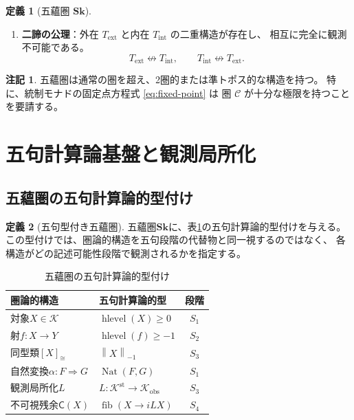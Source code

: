\documentclass[11pt,a4paper]{ltjsarticle}
\theoremstyle{definition}
\newtheorem{definition}{定義}[section]
\newtheorem{remark}{注記}[section]
\newcommand{\Sk}{\mathbf{Sk}}
\newcommand{\T}{\mathcal{T}}
\newcommand{\fold}{\mu}
\newcommand{\unfold}{\delta}
\newcommand{\ext}{\mathrm{ext}}
\newcommand{\intn}{\mathrm{int}}
\newcommand{\TExt}{T_{\ext}}
\newcommand{\TInt}{T_{\intn}}
\newcommand{\trunc}[1]{\left\lVert #1\right\rVert_{-1}}
\newcommand{\Kstab}{\mathcal{K}^{\mathrm{st}}}
\newcommand{\Kobs}{\mathcal{K}_{\mathrm{obs}}}
\newcommand{\Residual}{\mathsf{C}}
\begin{document}
\begin{definition}[五蘊圏 $\Sk$]
\begin{enumerate}[label=(\arabic*)]
  後退（展開）$\unfold^\T : \T \to F(\T)$ の間に
  \begin{equation}
  (\fold^\T \circ \T\unfold^\T) \cong (\unfold^\T \circ \fold^\T)
  \label{eq:frobenius}
  \end{equation}
  が成立する。
\item \textbf{二諦の公理}：外在 $\TExt$ と内在 $\TInt$ の二重構造が存在し、
  相互に完全に観測不可能である。
  \begin{equation}
  \TExt \not\leftrightarrow \TInt, \qquad
  \TInt \not\leftrightarrow \TExt.
  \end{equation}
\end{enumerate}
\end{definition}

\begin{remark}
五蘊圏は通常の圏を超え、2圏的または準トポス的な構造を持つ。
特に、統制モナドの固定点方程式 \eqref{eq:fixed-point} は
圏 $\mathcal{C}$ が十分な極限を持つことを要請する。
\end{remark}

\section{五句計算論基盤と観測局所化}
\label{sec:penta-foundation}

\subsection{五蘊圏の五句計算論的型付け}

\begin{definition}[五句型付き五蘊圏]
五蘊圏$\Sk$に、表\ref{tab:penta-typing}の五句計算論的型付けを与える。
この型付けでは、圏論的構造を五句段階の代替物と同一視するのではなく、
各構造がどの記述可能性段階で観測されるかを指定する。
\end{definition}

\begin{table}[htbp]
\centering
\caption{五蘊圏の五句計算論的型付け}
\label{tab:penta-typing}
\small
\begin{tabularx}{\textwidth}{@{}>{\raggedright\arraybackslash}X >{\raggedright\arraybackslash}X c@{}}
\toprule
圏論的構造 & 五句計算論的型 & 段階 \\
\midrule
対象$X\in\mathcal{K}$ & $\operatorname{hlevel}(X)\geq0$ & $S_1$ \\
射$f:X\to Y$ & $\operatorname{hlevel}(f)\geq-1$ & $S_2$ \\
同型類$[X]_{\cong}$ & $\trunc{X}$ & $S_3$ \\
自然変換$\alpha:F\Rightarrow G$ & $\operatorname{Nat}(F,G)$ & $S_1$ \\
観測局所化$L$ & $L:\Kstab\to\Kobs$ & $S_3$ \\
不可視残余$\Residual(X)$ & $\operatorname{fib}(X\to iLX)$ & $S_4$ \\
\bottomrule
\end{tabularx}
\end{table}
\end{document}

